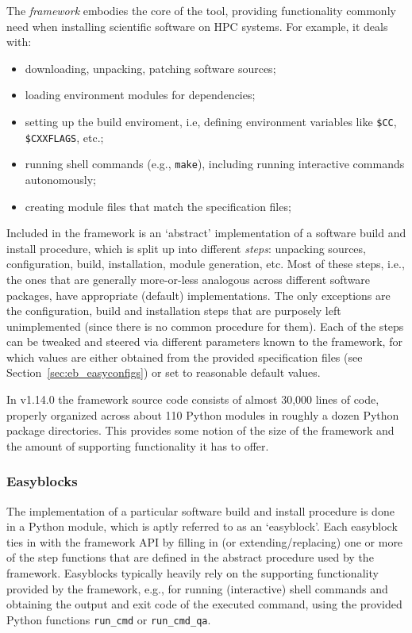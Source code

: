 The \easybuild{} \emph{framework} embodies the core of the tool,
providing functionality commonly need when installing scientific software on HPC
systems. For example, it deals with:
\begin{itemize}
    \item downloading, unpacking, patching software sources;
    \item loading environment modules for dependencies;
    \item setting up the build enviroment, i.e, defining environment variables
    like \texttt{\$CC},
    \texttt{\$CXXFLAGS}, etc.;
    \item running shell commands (e.g., \texttt{make}), including running
    interactive commands autonomously;
    \item creating module files that match the specification files;
\end{itemize}

Included in the framework is an `abstract' implementation of a software build and
install procedure, which is split up into different \emph{steps}: unpacking sources,
configuration, build, installation, module generation, etc. Most of these steps, i.e.,
the ones that are generally more-or-less analogous across
different software packages, have appropriate (default) implementations. The only
exceptions are the configuration, build and installation steps that are purposely
left unimplemented (since there is no common procedure for them). Each of the steps
can be tweaked and steered via different parameters known to the framework, for
which values are either obtained from the provided specification files (see
Section~\ref{sec:eb_easyconfigs}) or set to reasonable default values.

In \easybuild{} v1.14.0 the framework source code consists of almost 30,000 lines
of code, properly organized across about 110 Python modules in roughly a dozen Python
package directories. This provides some notion of the size of the \easybuild{}
framework and the amount of supporting functionality it has to offer.

\subsubsection{Easyblocks}
\label{sec:eb_easyblocks}

The implementation of a particular software build and install procedure is done in
a Python module, which is aptly referred to as an `easyblock'. Each easyblock
ties in with the framework API by filling in (or extending/replacing) one or more of
the step functions that are defined in the abstract procedure used by the \easybuild{}
framework. Easyblocks typically heavily rely on the supporting functionality provided
by the framework, e.g., for running (interactive) shell commands and obtaining the output and exit code of the executed command, using the provided Python functions
\texttt{run\_cmd} or \texttt{run\_cmd\_qa}.


